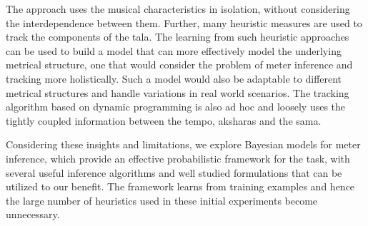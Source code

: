 The approach uses the musical characteristics in isolation, without considering the interdependence between them. Further, many heuristic measures are used to track the components of the \gls{tala}. The learning from such heuristic approaches can be used to build a model that can more effectively model the underlying metrical structure, one that would consider the problem of meter inference and tracking more holistically. Such a model would also be adaptable to different metrical structures and handle variations in real world scenarios. The tracking algorithm based on dynamic programming is also ad hoc and loosely uses the tightly coupled information between the tempo, \glspl{akshara} and the \gls{sama}. 

Considering these insights and limitations, we explore Bayesian models for meter inference, which provide an effective probabilistic framework for the task, with several useful inference algorithms and well studied formulations that can be utilized to our benefit. The framework learns from training examples and hence the large number of heuristics used in these initial experiments become unnecessary. 
%
%
%
